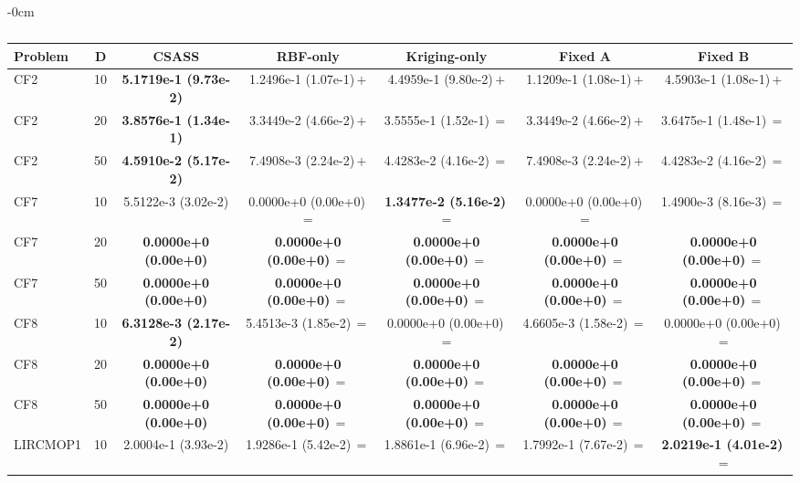 \begin{table}[!htbp]
\begin{ROneBlock}
\begin{adjustwidth}{-\extralength}{0cm}
\centering
\scriptsize
\setlength{\tabcolsep}{3pt}
\renewcommand{\arraystretch}{1.2}
\caption{}\label{tab:ablation-hv}
\begin{tabular*}{\linewidth}{@{\extracolsep{\fill}}lcccccc@{}}
\toprule
\textbf{Problem} & \textbf{D} & \textbf{CSASS} & \textbf{RBF-only} & \textbf{Kriging-only} & \textbf{Fixed A} & \textbf{Fixed B} \\
\midrule
CF2 & 10 & \textbf{5.1719e-1 (9.73e-2)} & 1.2496e-1 (1.07e-1)\,$+$ & 4.4959e-1 (9.80e-2)\,$+$ & 1.1209e-1 (1.08e-1)\,$+$ & 4.5903e-1 (1.08e-1)\,$+$ \\
CF2 & 20 & \textbf{3.8576e-1 (1.34e-1)} & 3.3449e-2 (4.66e-2)\,$+$ & 3.5555e-1 (1.52e-1)\,$=$ & 3.3449e-2 (4.66e-2)\,$+$ & 3.6475e-1 (1.48e-1)\,$=$ \\
CF2 & 50 & \textbf{4.5910e-2 (5.17e-2)} & 7.4908e-3 (2.24e-2)\,$+$ & 4.4283e-2 (4.16e-2)\,$=$ & 7.4908e-3 (2.24e-2)\,$+$ & 4.4283e-2 (4.16e-2)\,$=$ \\
CF7 & 10 & 5.5122e-3 (3.02e-2) & 0.0000e+0 (0.00e+0)\,$=$ & \textbf{1.3477e-2 (5.16e-2)}\,$=$ & 0.0000e+0 (0.00e+0)\,$=$ & 1.4900e-3 (8.16e-3)\,$=$ \\
CF7 & 20 & \textbf{0.0000e+0 (0.00e+0)} & \textbf{0.0000e+0 (0.00e+0)}\,$=$ & \textbf{0.0000e+0 (0.00e+0)}\,$=$ & \textbf{0.0000e+0 (0.00e+0)}\,$=$ & \textbf{0.0000e+0 (0.00e+0)}\,$=$ \\
CF7 & 50 & \textbf{0.0000e+0 (0.00e+0)} & \textbf{0.0000e+0 (0.00e+0)}\,$=$ & \textbf{0.0000e+0 (0.00e+0)}\,$=$ & \textbf{0.0000e+0 (0.00e+0)}\,$=$ & \textbf{0.0000e+0 (0.00e+0)}\,$=$ \\
CF8 & 10 & \textbf{6.3128e-3 (2.17e-2)} & 5.4513e-3 (1.85e-2)\,$=$ & 0.0000e+0 (0.00e+0)\,$=$ & 4.6605e-3 (1.58e-2)\,$=$ & 0.0000e+0 (0.00e+0)\,$=$ \\
CF8 & 20 & \textbf{0.0000e+0 (0.00e+0)} & \textbf{0.0000e+0 (0.00e+0)}\,$=$ & \textbf{0.0000e+0 (0.00e+0)}\,$=$ & \textbf{0.0000e+0 (0.00e+0)}\,$=$ & \textbf{0.0000e+0 (0.00e+0)}\,$=$ \\
CF8 & 50 & \textbf{0.0000e+0 (0.00e+0)} & \textbf{0.0000e+0 (0.00e+0)}\,$=$ & \textbf{0.0000e+0 (0.00e+0)}\,$=$ & \textbf{0.0000e+0 (0.00e+0)}\,$=$ & \textbf{0.0000e+0 (0.00e+0)}\,$=$ \\
LIRCMOP1 & 10 & 2.0004e-1 (3.93e-2) & 1.9286e-1 (5.42e-2)\,$=$ & 1.8861e-1 (6.96e-2)\,$=$ & 1.7992e-1 (7.67e-2)\,$=$ & \textbf{2.0219e-1 (4.01e-2)}\,$=$ \\

\end{tabular*}
\end{adjustwidth}
\end{ROneBlock}
\end{table}
